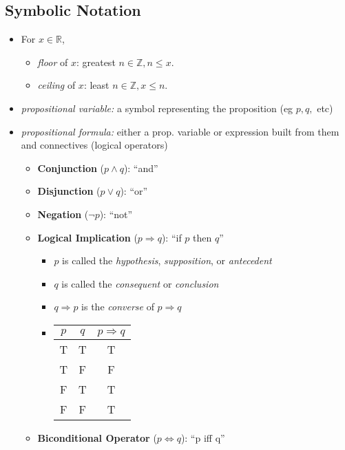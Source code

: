 \documentclass[11pt]{article}
\theoremstyle{definition}
\newcommand{\bb}[1]{\mathbb{#1}}
\begin{document}
\subsection*{Symbolic Notation}
\begin{itemize}
    \item For $x\in\bb{R}$,
    \begin{itemize}
        \item \emph{floor} of $x$: greatest $n\in\bb{Z}, n\le x$.
        \item \emph{ceiling} of $x$: least $n\in\bb{Z}, x\le n$.
    \end{itemize}
    \item \emph{propositional variable:} a symbol representing the proposition (eg $p,q,$ etc)
    \item \emph{propositional formula:} either a prop. variable or expression built from them and connectives (logical operators)
    \begin{itemize}
        \item \textbf{Conjunction} ($p\wedge q$): ``and''
        \item \textbf{Disjunction} ($p\vee q$): ``or''
        \item \textbf{Negation} ($\neg p$): ``not''
        \item \textbf{Logical Implication} ($p \Rightarrow q$): ``if $p$ then $q$''
        \begin{itemize}
            \item $p$ is called the \emph{hypothesis}, \emph{supposition}, or \emph{antecedent}
            \item $q$ is called the \emph{consequent} or \emph{conclusion}
            \item $q \Rightarrow p$ is the \emph{converse} of $p \Rightarrow q$
            \item \begin{tabular}{c|c|c}
                $p$ & $q$ & $p \Rightarrow q$\\ \hline
                T & T & T \\
                T & F & F \\
                F & T & T \\
                F & F & T
            \end{tabular}
        \end{itemize}
        \item \textbf{Biconditional Operator} ($p \Leftrightarrow q$): ``p iff q''
        \begin{itemize}

\end{itemize}
\end{itemize}
\end{itemize}
\end{document}
